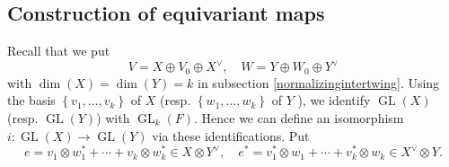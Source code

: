 \documentclass[article]{article}
\numberwithin{equation}{section}
\theoremstyle{definition}
\DeclareMathOperator{\GL}{GL}
\begin{document}
\subsection{Construction of equivariant maps}\label{constructionof}
Recall that we put 
$$V=X\oplus V_0\oplus X^{\vee}, \quad W=Y\oplus W_0\oplus Y^{\vee}$$
with $\dim(X)=\dim(Y)=k $ in subsection \ref{normalizingintertwing}. Using the basis $\left\{v_{1}, \ldots, v_{k}\right\}$ of $X$ (resp. $\left\{w_{1}, \ldots, w_{k}\right\}$ of $Y$ ), we identify $\GL(X)$ (resp. $\GL(Y)$) with $\GL_k(F)$. Hence we can define an isomorphism $i: \GL(X) \rightarrow \GL(Y) $ via these identifications. Put 
$$e=v_{1} \otimes w_{1}^{*}+\cdots+v_{k} \otimes w_{k}^{*} \in X \otimes Y^{\vee}, \quad e^{*}=v_{1}^{*} \otimes w_{1}+\cdots+v_{k}^{*} \otimes w_{k} \in X^{\vee} \otimes Y.$$
\end{document}
